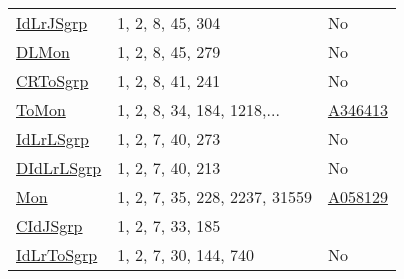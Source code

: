 {\begin{tabular}{|l|l|l|}
\hyperlink{IdLrJSgrp}{IdLrJSgrp}& 1, 2, 8, 45, 304 &No\\
\hyperlink{DLMon}{DLMon}& 1, 2, 8, 45, 279 &No\\
\hyperlink{CRToSgrp}{CRToSgrp}& 1, 2, 8, 41, 241 &No\\
\hyperlink{ToMon}{ToMon}& 1, 2, 8, 34, 184, 1218,... &\href{http://oeis.org/A346413}{A346413}\\
\hyperlink{IdLrLSgrp}{IdLrLSgrp}& 1, 2, 7, 40, 273 &No\\
\hyperlink{DIdLrLSgrp}{DIdLrLSgrp}& 1, 2, 7, 40, 213 &No\\
\hyperlink{Mon}{Mon}& 1, 2, 7, 35, 228, 2237, 31559 &\href{http://oeis.org/A058129}{A058129}\\
\hyperlink{CIdJSgrp}{CIdJSgrp}& 1, 2, 7, 33, 185 &\\
\hyperlink{IdLrToSgrp}{IdLrToSgrp}& 1, 2, 7, 30, 144, 740 &No\\
\end{tabular}

}
